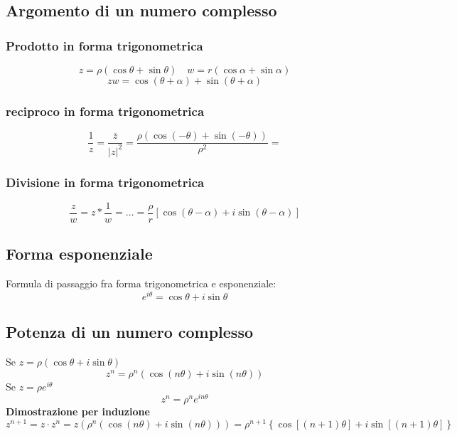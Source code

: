 \subsection{Argomento di un numero complesso}
\subsubsection{Prodotto in forma trigonometrica}
\[
	z = \rho\left( \cos \theta + \sin \theta \right) \quad w = r \left( \cos \alpha + \sin \alpha \right)
\]
\[
	z w = \cos\left( \theta + \alpha \right) + \sin \left(  \theta + \alpha \right)
\]
\subsubsection{reciproco in forma trigonometrica}
\[
	\frac{1}{z} = \frac{\overline{z}}{\left|z\right|^2} = \frac{\rho \left( \cos \left( -\theta \right) + \sin \left( -\theta \right)  \right) }{\rho ^2}=
\]

\subsubsection{Divisione in forma trigonometrica}
\[
	\frac{z}{w} = z * \frac{1}{w} = \ldots = \frac{\rho}{r}\left[ \cos\left( \theta - \alpha \right) + i \sin \left( \theta - \alpha \right)  \right]
\]
\subsection{Forma esponenziale}
Formula di passaggio fra forma trigonometrica e esponenziale:
\[
	e ^{ i \theta} = \cos \theta + i \sin \theta
\]
\subsection{Potenza di un numero complesso}
Se $z = \rho \left(  \cos \theta + i \sin \theta \right) $
\[
	z^{n} = \rho ^{n} \left( \cos \left( n \theta \right)  + i \sin \left( n \theta \right)  \right)
\]
Se $z = \rho e^{ i \theta}$
\[
	z^{n} = \rho ^{n} e ^{ i n \theta}
\]
\textbf{Dimostrazione per induzione}
\[
	z^{n+1} = z \cdot z^{n} = z \left( \rho ^{n} \left( \cos \left( n \theta \right)  + i \sin \left( n \theta \right)  \right)  \right)  = \rho ^{ n+1 } \left\{\cos \left[  \left( n+1 \right)  \theta \right] + i \sin \left[  \left( n+1 \right)  \theta \right]  \right\}
\]
